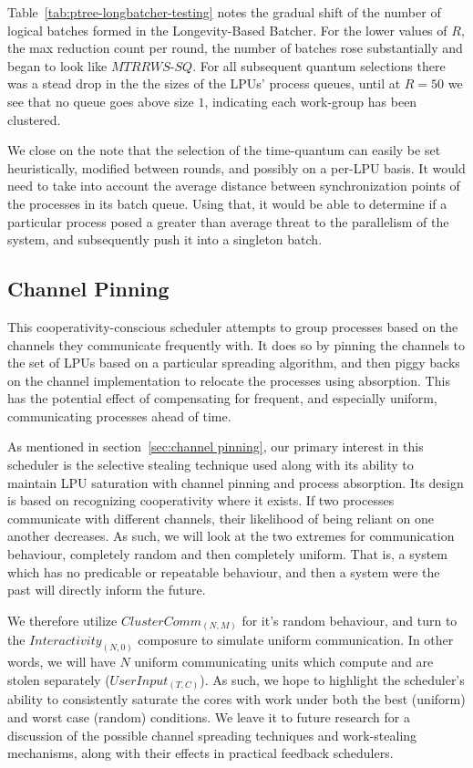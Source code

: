 Table~\ref{tab:ptree-longbatcher-testing} notes the gradual shift of the number of 
logical batches formed in the Longevity-Based Batcher. For the lower values of 
$R$, the max reduction count per round, the number of batches rose substantially and
began to look like $MTRRWS$-$SQ$. For all subsequent quantum selections there was
a stead drop in the the sizes of the LPUs' process queues, until at $R=50$ we 
see that no queue goes above size $1$, indicating each work-group has been clustered.

We close on the note that the selection of the time-quantum can easily be set 
heuristically, modified between rounds, and possibly on a per-LPU basis. It would
need to take into account the average distance between synchronization points
of the processes in its batch queue. Using that, it would be able to determine if
a particular process posed a greater than average threat to the parallelism of the 
system, and subsequently push it into a singleton batch.

\subsection{Channel Pinning}\label{sec:results-channelpinner}

This cooperativity-conscious scheduler attempts to group processes based on the 
channels they communicate frequently with. It does so by pinning the channels to
the set of LPUs based on a particular spreading algorithm, and then piggy backs
on the channel implementation to relocate the processes using absorption. This 
has the potential effect of compensating for frequent, and especially uniform,
communicating processes ahead of time.

As mentioned in section~\ref{sec:channel pinning}, our primary interest in this 
scheduler is the selective stealing technique used along with its ability to 
maintain LPU saturation with channel pinning and process absorption. Its design 
is based on recognizing cooperativity where it exists. If two processes communicate
with different channels, their likelihood of being reliant on one another decreases.
As such, we will look at the two extremes for communication behaviour, completely random 
and then completely uniform. That is, a system which has no predicable or
repeatable behaviour, and then a system were the past will directly inform the future. 

We therefore utilize $ClusterComm_{(N,M)}$ for it's random behaviour, and turn to the 
$Interactivity_{(N,0)}$ composure to simulate uniform communication. In other words,
we will have $N$ uniform communicating units which compute and are stolen separately 
($UserInput_{(T,C)}$). As such, we hope to highlight the scheduler's ability to 
consistently saturate the cores with work under both the best (uniform) and worst
case (random) conditions. We leave it to future research for a discussion of the 
possible channel spreading techniques and work-stealing mechanisms, along with their
effects in practical feedback schedulers.


